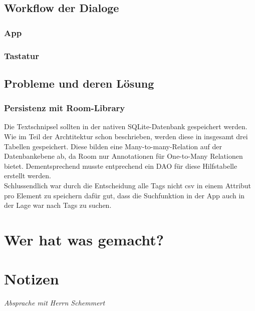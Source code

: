 \documentclass[11pt]{article}
\begin{document}
	\subsection{Workflow der Dialoge}
		\subsubsection{App}
		\subsubsection{Tastatur}

	\subsection{Probleme und deren Lösung}
	    \subsubsection{Persistenz mit Room-Library}
	        Die Textschnipsel sollten in der nativen SQLite-Datenbank gespeichert werden. Wie im Teil der Archtitektur schon beschrieben, werden diese in insgesamt drei Tabellen gespeichert. Diese bilden eine Many-to-many-Relation auf der Datenbankebene ab, da Room nur Annotationen für One-to-Many Relationen bietet. Dementsprechend musste entprechend ein DAO für diese Hilfstabelle erstellt werden. \\
	        Schlussendlich war durch die Entscheidung alle Tags nicht csv in einem Attribut pro Element zu speichern dafür gut, dass die Suchfunktion in der App auch in der Lage war nach Tags zu suchen.

\section{Wer hat was gemacht?}
\section{Notizen}
	\emph{Absprache mit Herrn Schemmert}
	
\end{document}
